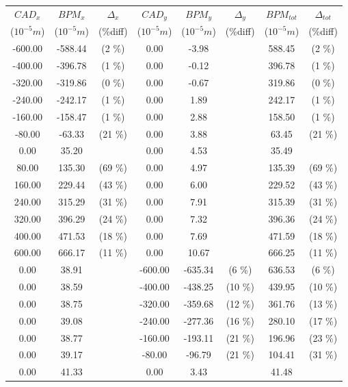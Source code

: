 \begin{table}
\centering
\begin{tabular}{c c c c c c c c}
\toprule
\textbf{$CAD_{x}$} & \textbf{$BPM_{x}$ } & \textbf{$\Delta_{x}$} &\textbf{$CAD_{y}$} & \textbf{$BPM_{y}$} & \textbf{$\Delta_{y}$} & \textbf{$BPM_{tot}$} & \textbf{$\Delta_{tot}$} \\
($10^{-5} m$) & ($10^{-5} m$) & (\%diff) & ($10^{-5} m$) & ($10^{-5} m$) & (\%diff) & ($10^{-5} m$) & (\%diff) \\
\midrule
-600.00 & -588.44 &  (2 \%) & 0.00 & -3.98 &  & 588.45 &  (2 \%)\\
-400.00 & -396.78 &  (1 \%) & 0.00 & -0.12 &  & 396.78 &  (1 \%)\\
-320.00 & -319.86 &  (0 \%) & 0.00 & -0.67 &  & 319.86 &  (0 \%)\\
-240.00 & -242.17 &  (1 \%) & 0.00 & 1.89 &  & 242.17 &  (1 \%)\\
-160.00 & -158.47 &  (1 \%) & 0.00 & 2.88 &  & 158.50 &  (1 \%)\\
-80.00 & -63.33 &  (21 \%) & 0.00 & 3.88 &  & 63.45 &  (21 \%)\\
0.00 & 35.20 &  & 0.00 & 4.53 &  & 35.49 & \\
80.00 & 135.30 &  (69 \%) & 0.00 & 4.97 &  & 135.39 &  (69 \%)\\
160.00 & 229.44 &  (43 \%) & 0.00 & 6.00 &  & 229.52 &  (43 \%)\\
240.00 & 315.29 &  (31 \%) & 0.00 & 7.91 &  & 315.39 &  (31 \%)\\
320.00 & 396.29 &  (24 \%) & 0.00 & 7.32 &  & 396.36 &  (24 \%)\\
400.00 & 471.53 &  (18 \%) & 0.00 & 7.69 &  & 471.59 &  (18 \%)\\
600.00 & 666.17 &  (11 \%) & 0.00 & 10.67 &  & 666.25 &  (11 \%)\\
0.00 & 38.91 &  & -600.00 & -635.34 &  (6 \%) & 636.53 &  (6 \%)\\
0.00 & 38.59 &  & -400.00 & -438.25 &  (10 \%) & 439.95 &  (10 \%)\\
0.00 & 38.75 &  & -320.00 & -359.68 &  (12 \%) & 361.76 &  (13 \%)\\
0.00 & 39.08 &  & -240.00 & -277.36 &  (16 \%) & 280.10 &  (17 \%)\\
0.00 & 38.77 &  & -160.00 & -193.11 &  (21 \%) & 196.96 &  (23 \%)\\
0.00 & 39.17 &  & -80.00 & -96.79 &  (21 \%) & 104.41 &  (31 \%)\\
0.00 & 41.33 &  & 0.00 & 3.43 &  & 41.48 & \\

\end{tabular}
\end{table}
